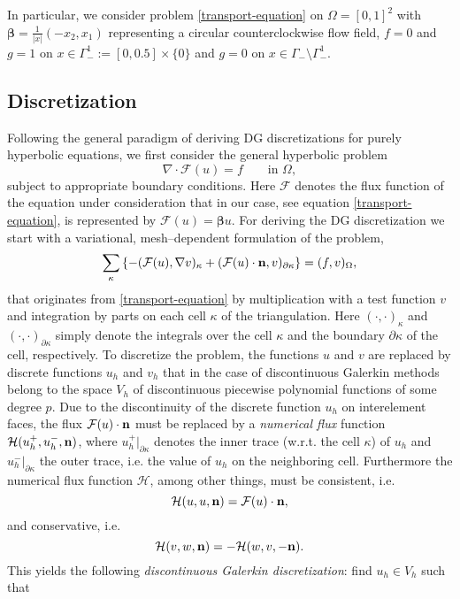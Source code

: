 \documentclass[11pt]{article}
\begin{document}
In particular, we consider problem \eqref{transport-equation} on
$\Omega=[0,1]^2$ with $\boldsymbol\beta=\frac{1}{|x|}(-x_2, x_1)$
representing a circular counterclockwise flow field, $f=0$ and $g=1$
on $x\in\Gamma_-^1:=[0,0.5]\times\{0\}$ and $g=0$ on $x\in
\Gamma_-\setminus \Gamma_-^1$.
\subsection{Discretization}
Following the general paradigm of deriving DG discretizations for
purely hyperbolic equations, we first consider the general hyperbolic
problem
\[
  \nabla\cdot {\mathcal F}(u)=f  \qquad\mbox{in }\Omega,
\]
subject to appropriate boundary conditions. Here ${\mathcal F}$
denotes the flux function of the equation under consideration that in
our case, see equation \eqref{transport-equation}, is represented by
${\mathcal F}(u)=\boldsymbol\beta u$.  For deriving the DG
discretization we start with a variational, mesh--dependent
formulation of the problem,
\[
  \sum_\kappa\left\{-({\mathcal F}(u),\nabla v)_\kappa+({\mathcal
  F}(u)\cdot{\bf n}, v)_{\partial\kappa}\right\}=(f,v)_\Omega,
\]
that originates from \eqref{transport-equation} by multiplication with
a test function $v$ and integration by parts on each cell $\kappa$ of
the triangulation. Here $(\cdot, \cdot)_\kappa$ and $(\cdot,
\cdot)_{\partial\kappa}$ simply denote the integrals over the cell
$\kappa$ and the boundary $\partial\kappa$ of the cell,
respectively. To discretize the problem, the functions $u$ and $v$ are
replaced by discrete functions $u_h$ and $v_h$ that in the case of
discontinuous Galerkin methods belong to the space $V_h$ of
discontinuous piecewise polynomial functions of some degree $p$. Due
to the discontinuity of the discrete function $u_h$ on interelement
faces, the flux ${\mathcal F}(u)\cdot{\bf n}$ must be replaced by a
\emph{numerical flux} function ${\mathcal H}(u_h^+, u_h^-, {\bf n})$,
where $u_h^+|_{\partial\kappa}$ denotes the inner trace (w.r.t.  the
cell $\kappa$) of $u_h$ and $u_h^-|_{\partial\kappa}$ the outer trace,
i.e. the value of $u_h$ on the neighboring cell. Furthermore the
numerical flux function ${\mathcal H}$, among other things, must be
consistent, i.e.
\[
{\mathcal H}(u,u,{\bf n})={\mathcal F}(u)\cdot{\bf n},
\]
and conservative, i.e.
\begin{equation}\label{conservative}
{\mathcal H}(v,w,{\bf n})=-{\mathcal H}(w,v,-{\bf n}).
\end{equation}
This yields the following \emph{discontinuous Galerkin
  discretization}: find $u_h\in V_h$ such that
\end{document}
